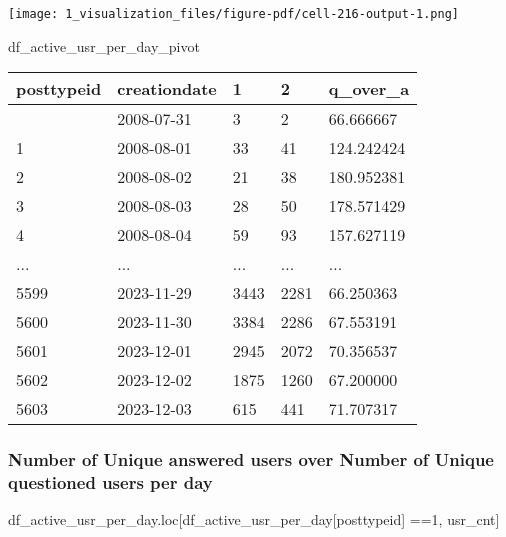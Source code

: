 \documentclass[
  letterpaper,
  DIV=11,
  numbers=noendperiod]{scrartcl}
\newenvironment{Shaded}{\begin{snugshade}}{\end{snugshade}}
\newcommand{\NormalTok}[1]{\textcolor[rgb]{0.00,0.23,0.31}{#1}}
\newcommand{\OperatorTok}[1]{\textcolor[rgb]{0.37,0.37,0.37}{#1}}
\newcommand{\StringTok}[1]{\textcolor[rgb]{0.13,0.47,0.30}{#1}}
\begin{document}
\texttt{[image: 1\_visualization\_files/figure-pdf/cell-216-output-1.png]}

\begin{Shaded}
\begin{Highlighting}[]
\NormalTok{df\_active\_usr\_per\_day\_pivot}
\end{Highlighting}
\end{Shaded}

\begin{longtable}[]{@{}lllll@{}}
\toprule\noalign{}
posttypeid & creationdate & 1 & 2 & q\_over\_a \\
\midrule\noalign{}
\endhead
\bottomrule\noalign{}
\endlastfoot
0 & 2008-07-31 & 3 & 2 & 66.666667 \\
1 & 2008-08-01 & 33 & 41 & 124.242424 \\
2 & 2008-08-02 & 21 & 38 & 180.952381 \\
3 & 2008-08-03 & 28 & 50 & 178.571429 \\
4 & 2008-08-04 & 59 & 93 & 157.627119 \\
... & ... & ... & ... & ... \\
5599 & 2023-11-29 & 3443 & 2281 & 66.250363 \\
5600 & 2023-11-30 & 3384 & 2286 & 67.553191 \\
5601 & 2023-12-01 & 2945 & 2072 & 70.356537 \\
5602 & 2023-12-02 & 1875 & 1260 & 67.200000 \\
5603 & 2023-12-03 & 615 & 441 & 71.707317 \\
\end{longtable}

\subsubsection{Number of Unique answered users over Number of Unique
questioned users per
day}\label{number-of-unique-answered-users-over-number-of-unique-questioned-users-per-day}

\begin{Shaded}
\begin{Highlighting}[]
\NormalTok{df\_active\_usr\_per\_day.loc[df\_active\_usr\_per\_day[}\StringTok{\textquotesingle{}posttypeid\textquotesingle{}}\NormalTok{] }\OperatorTok{==}\StringTok{\textquotesingle{}1\textquotesingle{}}\NormalTok{, }\StringTok{\textquotesingle{}usr\_cnt\textquotesingle{}}\NormalTok{]}
\end{Highlighting}
\end{Shaded}
\end{document}
